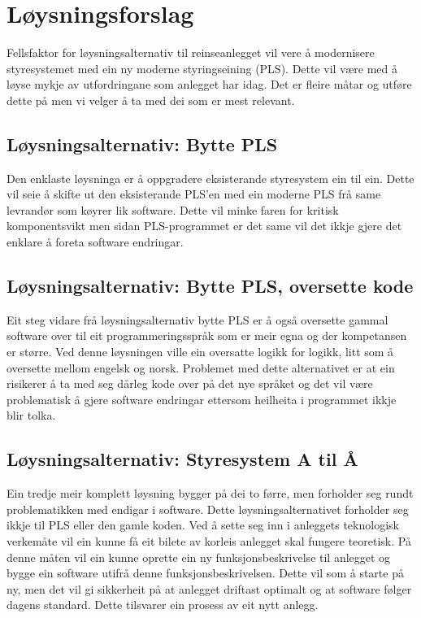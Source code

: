 \newpage
\section{Løysningsforslag}
Fellsfaktor for løysningsalternativ til reinseanlegget vil vere å modernisere 
styresystemet med ein ny moderne styringseining (PLS). 
Dette vil være med å løyse mykje av utfordringane som anlegget har idag. 
Det er fleire måtar og utføre dette på men vi velger å ta med dei som er mest relevant.
\newline
\subsection{Løysningsalternativ: Bytte PLS}
Den enklaste løysninga er å oppgradere eksisterande styresystem ein til ein. 
Dette vil seie å skifte ut den eksisterande PLS'en med ein moderne PLS frå same levrandør som køyrer lik software.
Dette vil minke faren for kritisk komponentsvikt men sidan PLS-programmet er det same vil det ikkje gjere det enklare å foreta
software endringar.

\subsection{Løysningsalternativ: Bytte PLS, oversette kode}
Eit steg vidare frå løysningsalternativ bytte PLS er å også oversette gammal software over til eit programmeringsspråk
som er meir egna og der kompetansen er større. Ved denne løysningen ville ein oversatte logikk for logikk, litt som å
oversette mellom engelsk og norsk.\newline
Problemet med dette alternativet er at ein risikerer å ta med seg dårleg kode over på det nye språket og
det vil være problematisk å gjere software endringar ettersom heilheita i programmet ikkje blir tolka.

\subsection{Løysningsalternativ: Styresystem A til Å}
Ein tredje meir komplett løysning bygger på dei to førre, men forholder seg rundt problematikken med endigar i software.
Dette løysningsalternativet forholder seg ikkje til PLS eller den gamle koden.\newline
Ved å sette seg inn i anleggets teknologisk verkemåte vil ein kunne få eit bilete av korleis anlegget skal fungere teoretisk.
På denne måten vil ein kunne oprette ein ny funksjonsbeskrivelse til anlegget og bygge ein software utifrå denne funksjonsbeskrivelsen.
Dette vil som å starte på ny, men det vil gi sikkerheit på at anlegget driftast optimalt og at software følger
dagens standard. Dette tilsvarer ein prosess av eit nytt anlegg.

